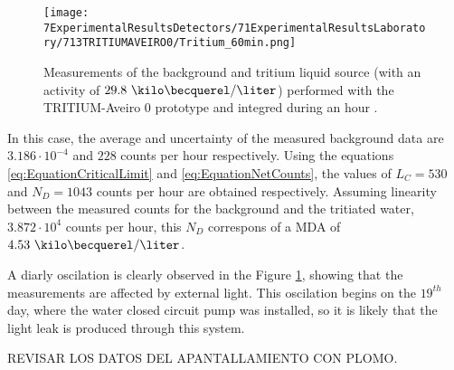 \begin{figure}[h]
\centering
\texttt{[image: 7ExperimentalResultsDetectors/71ExperimentalResultsLaboratory/713TRITIUMAVEIRO0/Tritium\_60min.png]}
\caption{Measurements of the background and tritium liquid source (with an activity of $29.8~\kilo\becquerel/\liter$) performed with the TRITIUM-Aveiro 0 prototype and integred during an hour \cite{ExperimentalPaperCarlos}.\label{fig:Tritium60min}}
\end{figure}

In this case, the average and uncertainty of the measured background data are $3.186 \cdot{} 10^{-4}$ and $228$ counts per hour respectively. Using the equations \ref{eq:EquationCriticalLimit} and \ref{eq:EquationNetCounts}, the values of $L_C=530$ and $N_D=1043$ counts per hour are obtained respectively. Assuming linearity between the measured counts for the background and the tritiated water, $3.872\cdot{}10^4$ counts per hour, this $N_D$ correspons of a MDA of $4.53~\kilo\becquerel/\liter$.

A diarly oscilation is clearly observed in the Figure \ref{fig:Tritium60min}, showing that the measurements are affected by external light. This oscilation begins on the $19^{th}$ day, where the water closed circuit pump was installed, so it is likely that the light leak is produced through this system.









REVISAR LOS DATOS DEL APANTALLAMIENTO CON PLOMO.
